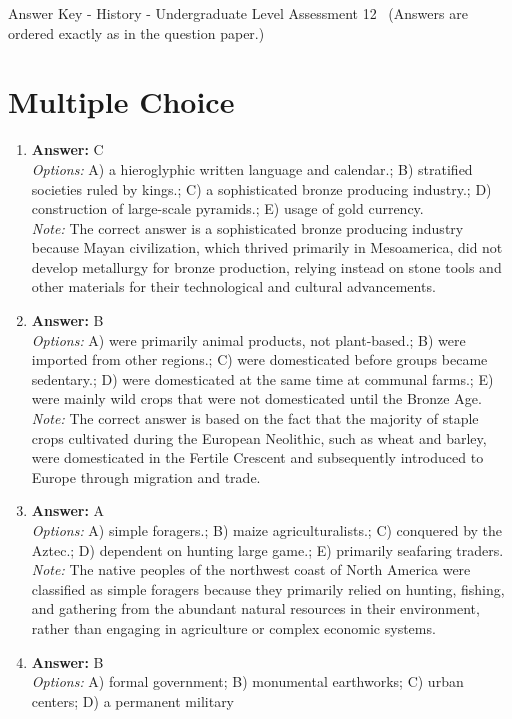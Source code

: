 \documentclass[12pt]{article}
\begin{document}
\begin{center}
Answer Key - History - Undergraduate Level Assessment 12 \
\small (Answers are ordered exactly as in the question paper.)
\end{center}

\section*{Multiple Choice}
\begin{enumerate}[label=\arabic*.]
\item \textbf{Answer:} C
\\ \textit{Options:} A) a hieroglyphic written language and calendar.; B) stratified societies ruled by kings.; C) a sophisticated bronze producing industry.; D) construction of large-scale pyramids.; E) usage of gold currency.
\\ \textit{Note:} The correct answer is a sophisticated bronze producing industry because Mayan civilization, which thrived primarily in Mesoamerica, did not develop metallurgy for bronze production, relying instead on stone tools and other materials for their technological and cultural advancements.
\item \textbf{Answer:} B
\\ \textit{Options:} A) were primarily animal products, not plant-based.; B) were imported from other regions.; C) were domesticated before groups became sedentary.; D) were domesticated at the same time at communal farms.; E) were mainly wild crops that were not domesticated until the Bronze Age.
\\ \textit{Note:} The correct answer is based on the fact that the majority of staple crops cultivated during the European Neolithic, such as wheat and barley, were domesticated in the Fertile Crescent and subsequently introduced to Europe through migration and trade.
\item \textbf{Answer:} A
\\ \textit{Options:} A) simple foragers.; B) maize agriculturalists.; C) conquered by the Aztec.; D) dependent on hunting large game.; E) primarily seafaring traders.
\\ \textit{Note:} The native peoples of the northwest coast of North America were classified as simple foragers because they primarily relied on hunting, fishing, and gathering from the abundant natural resources in their environment, rather than engaging in agriculture or complex economic systems.
\item \textbf{Answer:} B
\\ \textit{Options:} A) formal government; B) monumental earthworks; C) urban centers; D) a permanent military

\end{enumerate}
\end{document}
